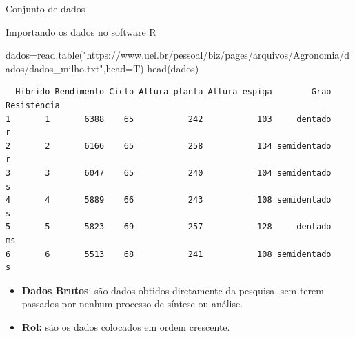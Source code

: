 \documentclass[
  ignorenonframetext,
]{beamer}
\newenvironment{Shaded}{\begin{snugshade}}{\end{snugshade}}
\newcommand{\AttributeTok}[1]{\textcolor[rgb]{0.40,0.45,0.13}{#1}}
\newcommand{\FunctionTok}[1]{\textcolor[rgb]{0.28,0.35,0.67}{#1}}
\newcommand{\NormalTok}[1]{\textcolor[rgb]{0.00,0.23,0.31}{#1}}
\newcommand{\OtherTok}[1]{\textcolor[rgb]{0.00,0.23,0.31}{#1}}
\newcommand{\StringTok}[1]{\textcolor[rgb]{0.13,0.47,0.30}{#1}}
\begin{document}
\begin{frame}{Conjunto de dados}
\label{conjunto-de-dados}
\end{frame}

\begin{frame}[fragile]{Importando os dados no software R}
\label{importando-os-dados-no-software-r}
\begin{Shaded}
\begin{Highlighting}[]
\NormalTok{dados}\OtherTok{=}\FunctionTok{read.table}\NormalTok{(}\StringTok{"https://www.uel.br/pessoal/biz/pages/arquivos/Agronomia/dados/dados\_milho.txt"}\NormalTok{,}\AttributeTok{head=}\NormalTok{T)}
\FunctionTok{head}\NormalTok{(dados)}
\end{Highlighting}
\end{Shaded}

\begin{verbatim}
  Hibrido Rendimento Ciclo Altura_planta Altura_espiga        Grao Resistencia
1       1       6388    65           242           103     dentado           r
2       2       6166    65           258           134 semidentado           r
3       3       6047    65           240           104 semidentado           s
4       4       5889    66           243           108 semidentado           s
5       5       5823    69           257           128     dentado          ms
6       6       5513    68           241           108 semidentado           s
\end{verbatim}
\end{frame}

\begin{frame}
\begin{itemize}
\item
  \textbf{Dados Brutos}: são dados obtidos diretamente da pesquisa, sem
  terem passados por nenhum processo de síntese ou análise.
\item
  \textbf{Rol:} são os dados colocados em ordem crescente.
\end{itemize}
\end{frame}
\end{document}
